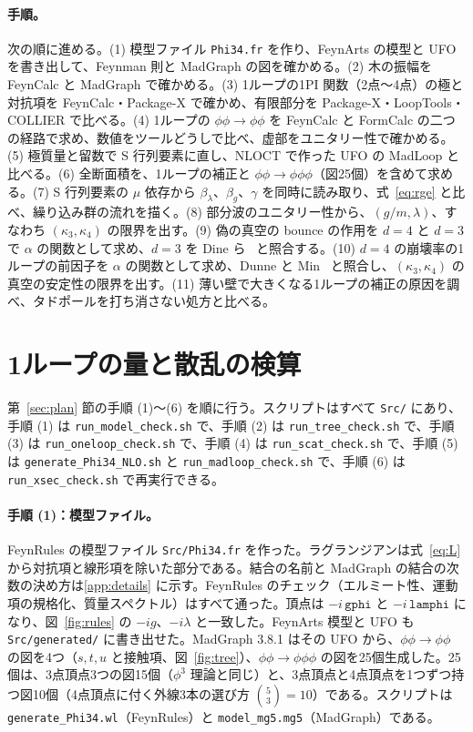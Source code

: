 \documentclass[a4paper,10pt]{ltjsarticle}
\begin{document}
\paragraph{手順。}次の順に進める。(1) 模型ファイル \texttt{Phi34.fr} を作り、FeynArts の模型と UFO を書き出して、Feynman 則と MadGraph の図を確かめる。(2) 木の振幅を FeynCalc と MadGraph で確かめる。(3) 1ループの1PI 関数（2点〜4点）の極と対抗項を FeynCalc・Package-X で確かめ、有限部分を Package-X・LoopTools・COLLIER で比べる。(4) 1ループの $\phi\phi\to\phi\phi$ を FeynCalc と FormCalc の二つの経路で求め、数値をツールどうしで比べ、虚部をユニタリー性で確かめる。(5) 極質量と留数で S 行列要素に直し、NLOCT で作った UFO の MadLoop と比べる。(6) 全断面積を、1ループの補正と $\phi\phi\to\phi\phi\phi$（図25個）を含めて求める。(7) S 行列要素の $\mu$ 依存から $\beta_\lambda$、$\beta_g$、$\gamma$ を同時に読み取り、式~\eqref{eq:rge} と比べ、繰り込み群の流れを描く。(8) 部分波のユニタリー性から、$(g/m,\lambda)$、すなわち $(\kappa_3,\kappa_4)$ の限界を出す。(9) 偽の真空の bounce の作用を $d=4$ と $d=3$ で $\alpha$ の関数として求め、$d=3$ を Dine ら~\cite{dine92} と照合する。(10) $d=4$ の崩壊率の1ループの前因子を $\alpha$ の関数として求め、Dunne と Min~\cite{dunnemin} と照合し、$(\kappa_3,\kappa_4)$ の真空の安定性の限界を出す。(11) 薄い壁で大きくなる1ループの補正の原因を調べ、タドポールを打ち消さない処方と比べる。

\section{1ループの量と散乱の検算}\label{sec:checks}

第~\ref{sec:plan} 節の手順 (1)〜(6) を順に行う。スクリプトはすべて \texttt{Src/} にあり、手順 (1) は \texttt{run\_model\_check.sh} で、手順 (2) は \texttt{run\_tree\_check.sh} で、手順 (3) は \texttt{run\_oneloop\_check.sh} で、手順 (4) は \texttt{run\_scat\_check.sh} で、手順 (5) は \texttt{generate\_Phi34\_NLO.sh} と \texttt{run\_madloop\_check.sh} で、手順 (6) は \texttt{run\_xsec\_check.sh} で再実行できる。

\paragraph{手順 (1)：模型ファイル。}FeynRules の模型ファイル \texttt{Src/Phi34.fr} を作った。ラグランジアンは式~\eqref{eq:L} から対抗項と線形項を除いた部分である。結合の名前と MadGraph の結合の次数の決め方は\ref{app:details} に示す。FeynRules のチェック（エルミート性、運動項の規格化、質量スペクトル）はすべて通った。頂点は $-i\,\texttt{gphi}$ と $-i\,\texttt{lamphi}$ になり、図~\ref{fig:rules} の $-ig$、$-i\lambda$ と一致した。FeynArts 模型と UFO も \texttt{Src/generated/} に書き出せた。MadGraph 3.8.1 はその UFO から、$\phi\phi\to\phi\phi$ の図を4つ（$s,t,u$ と接触項、図~\ref{fig:tree}）、$\phi\phi\to\phi\phi\phi$ の図を25個生成した。25個は、3点頂点3つの図15個（$\phi^3$ 理論と同じ）と、3点頂点と4点頂点を1つずつ持つ図10個（4点頂点に付く外線3本の選び方 $\binom53=10$）である。スクリプトは \texttt{generate\_Phi34.wl}（FeynRules）と \texttt{model\_mg5.mg5}（MadGraph）である。
\end{document}
